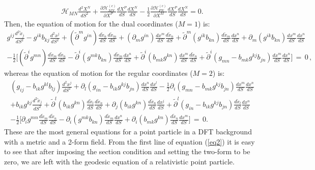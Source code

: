 \documentclass[prd, aps, superscriptaddress, preprintnumbers, twocolumn, floatfix, nofootinbib]{revtex4}
\begin{document}
\begin{widetext}

\begin{eqnarray}\label{relativisticDFT}
\mathcal{H}_{MN}\frac{d^2 X^N}{dS^2}+ \frac{\partial \mathcal{H}^{(c)}_{MN}}{\partial X^P}\frac{d X^P}{dS} \frac{dX^N}{dS}-\frac{1}{2} \frac{\partial\mathcal{H}^{(c)}_{PN}}{\partial X^M}  \frac{dX^P}{dS}\frac{dX^N}{dS}=0.
\end{eqnarray}
Then, the equation of motion for the dual coordinates ($M=1$) is:
\begin{eqnarray} \label{eq1}
g^{ij}\frac{d^2 \tilde{x}_j}{dS^2} - g^{ik}b_{kj}\frac{d^2 x^j}{dS^2}
 + (\tilde{\partial}^m g^{in})\frac{d \tilde{x}_n}{dS} \frac{d\tilde{x}_m}{dS} + (\partial_m g^{in})\frac{d x^m}{dS} \frac{d\tilde{x}_n}{dS}+ \tilde{\partial}^m (g^{ik}b_{kn})\frac{d \tilde{x}_m}{dS} \frac{dx^n}{dS}+ \partial_m (g^{ik}b_{kn})\frac{d x^m}{dS} \frac{dx^n}{dS}
 \nonumber \\-\frac{1}{2}\bigg[ (\tilde{\partial}^i g^{mn}) \frac{d\tilde{x}_m}{dS}\frac{d\tilde{x}_n}{dS}-\tilde{\partial}^i (g^{mk}b_{kn})  \frac{d\tilde{x}_m}{dS}\frac{dx^n}{dS}+ \tilde{\partial}^i (b_{mk}g^{kn}) \frac{dx^m}{dS}\frac{d\tilde{x}_n}{dS}+ \tilde{\partial}^i(g_{mn}-b_{mk}g^{kj}b_{jn}) \frac{dx^m}{dS}\frac{dx^n}{dS}\bigg] \, = \, 0 \, ,
\end{eqnarray}
whereas the equation of motion for the regular coordinates ($M=2$) is:
\begin{eqnarray} \label{eq2}
\left(g_{ij}-b_{ik}g^{kl}b_{lj}\right)\frac{d^2x^j}{dS^2}
+\partial_l (g_{in}-b_{ik}g^{kj}b_{jn})\frac{dx^n}{dS}\frac{dx^l}{dS}
-\frac{1}{2} \partial_i(g_{mn}-b_{mk}g^{kj}b_{jn})\frac{dx^m}{dS}\frac{dx^n}{dS}
\nonumber\\
+b_{ik}g^{kj}\frac{d^2 \tilde{x}_j}{dS^2}+\tilde{\partial}^l (b_{ik} g^{kn})\frac{d\tilde{x}_l}{dS}\frac{d\tilde{x}_n}{dS} + \partial_j (b_{ik}g^{kn})\frac{d\tilde{x}_n}{dS}\frac{dx^j}{dS}
+\tilde{\partial}^l (g_{in} - b_{ik}g^{kj}b_{jn})\frac{d\tilde{x}_l}{dS}\frac{dx^n}{dS} \nonumber \\
-\frac{1}{2} \bigg[ \partial_i g^{mn}\frac{d\tilde{x}_m}{dS}\frac{d\tilde{x}_n}{dS} -
\partial_i (g^{mk}b_{kn})\frac{d\tilde{x}_m}{dS}\frac{dx^n}{dS} +
\partial_i(b_{mk}g^{kn})\frac{d\tilde{x}_n}{dS}\frac{dx^m}{dS} \bigg] \, = \, 0.
\end{eqnarray}
These are the most general equations for a point particle in a DFT background with a metric and
a 2-form field. From the first line of equation (\ref{eq2}) it is easy to see that after imposing the section condition and setting the two-form to be zero, we are left with the geodesic equation of a relativistic point particle.

\end{widetext}
\end{document}
